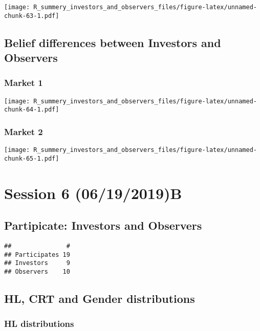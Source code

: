 \documentclass[]{article}
\begin{document}
\texttt{[image: R\_summery\_investors\_and\_observers\_files/figure-latex/unnamed-chunk-63-1.pdf]}

\hypertarget{belief-differences-between-investors-and-observers-4}{%
\subsection{Belief differences between Investors and
Observers}\label{belief-differences-between-investors-and-observers-4}}

\hypertarget{market-1-4}{%
\subsubsection{Market 1}\label{market-1-4}}

\texttt{[image: R\_summery\_investors\_and\_observers\_files/figure-latex/unnamed-chunk-64-1.pdf]}

\hypertarget{market-2-4}{%
\subsubsection{Market 2}\label{market-2-4}}

\texttt{[image: R\_summery\_investors\_and\_observers\_files/figure-latex/unnamed-chunk-65-1.pdf]}

\hypertarget{session-6-06192019b}{%
\section{Session 6 (06/19/2019)B}\label{session-6-06192019b}}

\hypertarget{partipicate-investors-and-observers-5}{%
\subsection{Partipicate: Investors and
Observers}\label{partipicate-investors-and-observers-5}}

\begin{verbatim}
##               #
## Participates 19
## Investors     9
## Observers    10
\end{verbatim}

\hypertarget{hl-crt-and-gender-distributions-5}{%
\subsection{HL, CRT and Gender
distributions}\label{hl-crt-and-gender-distributions-5}}

\hypertarget{hl-distributions-5}{%
\subsubsection{HL distributions}\label{hl-distributions-5}}
\end{document}
